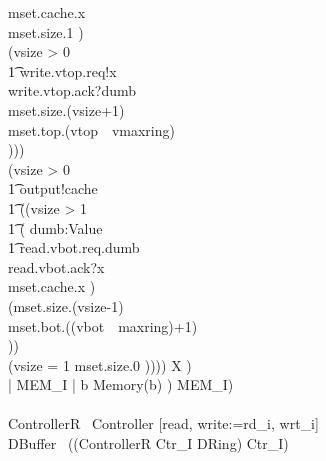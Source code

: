 \documentclass[10pt]{article}
\begin{document}
\begin{circus}
                                 mset.cache.x \then \\
                                 mset.size.1 \then \Skip)
                             \\
                             \extchoice
                             (\lcircguard vsize > 0 \rcircguard \circguard \\
                             \t1
                                 write.vtop.req!x \then \\
                                 write.vtop.ack?dumb \then \\
                                 mset.size.(vsize+1) \then \\
                                 mset.top.(vtop~\mod~vmaxring) \then \\
                                 \Skip))) \\
                        \extchoice
                    (\lcircguard vsize > 0 \rcircguard \circguard \\
                    \t1
                        output!cache \then \\
                        \t1
                            ((\lcircguard vsize > 1 \rcircguard \circguard \\
                                                                \t1
                            (
                            \Intchoice dumb:Value \circspot \\
                            \t1
                            read.vbot.req.dumb \then \\
                            read.vbot.ack?x \then \\
                            mset.cache.x \then \Skip
                            )\circseq\ \\
                            (mset.size.(vsize-1) \then \\
                                    mset.bot.((vbot~\mod~maxring)+1) \then \\
                                    \Skip))
                        \\
                        \extchoice (\lcircguard vsize = 1 \rcircguard
                                    \circguard mset.size.0 \then \Skip))))
                \circseq X
            ) \\
            \lpar {} | MEM\_I | { b } \rpar Memory(b)
        ) \circhide MEM\_I)
    \\
    \circend
    \\
    \circprocess ControllerR \circdef\ Controller [read, write:=rd\_i, wrt\_i]
    \\
    \circprocess DBuffer \circdef\ ((ControllerR \lpar Ctr\_I \rpar DRing) \circhide Ctr\_I)
\end{circus}%
\end{document}
